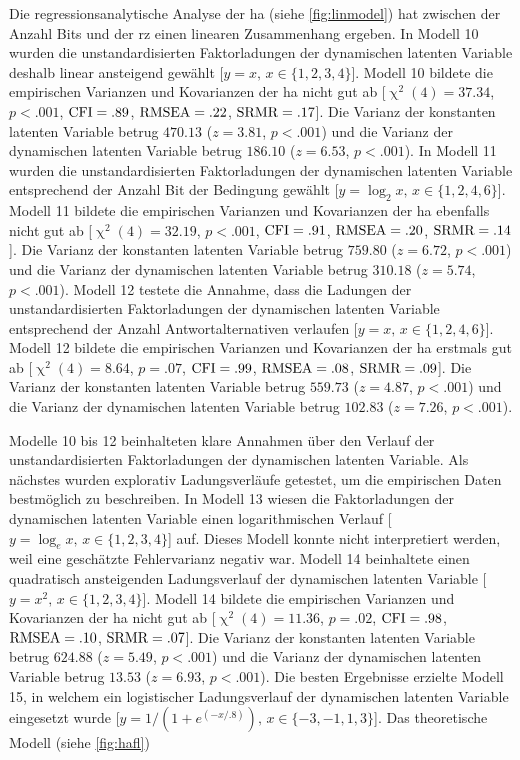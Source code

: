 \documentclass[11pt, twoside, a4paper]{book}		%
\begin{document}
Die regressionsanalytische Analyse der \gls{ha} (siehe \autoref{fig:linmodel}) hat zwischen der Anzahl Bits und der \gls{rz} einen linearen Zusammenhang ergeben. In Modell 10 wurden die unstandardisierten Faktorladungen der dynamischen latenten Variable deshalb linear ansteigend gewählt [$y=x,\,x\in\{1, 2, 3, 4\}$]. Modell 10 bildete die empirischen Varianzen und Kovarianzen der \gls{ha} nicht gut ab [$\upchi^2(4)=37.34$, $p<.001$, $\textnormal{CFI}=.89$, $\textnormal{RMSEA}=.22$, $\textnormal{SRMR}=.17$]. Die Varianz der konstanten latenten Variable betrug $470.13$ ($z=3.81$, $p<.001$) und die Varianz der dynamischen latenten Variable betrug $186.10$ ($z=6.53$, $p<.001$).
In Modell 11 wurden die unstandardisierten Faktorladungen der dynamischen latenten Variable entsprechend der Anzahl Bit der Bedingung gewählt [$y=\log_{2}x,\,x\in\{1, 2, 4, 6\}$]. Modell 11 bildete die empirischen Varianzen und Kovarianzen der \gls{ha} ebenfalls nicht gut ab [$\upchi^2(4)=32.19$, $p<.001$, $\textnormal{CFI}=.91$, $\textnormal{RMSEA}=.20$, $\textnormal{SRMR}=.14$]. Die Varianz der konstanten latenten Variable betrug $759.80$ ($z=6.72$, $p<.001$) und die Varianz der dynamischen latenten Variable betrug $310.18$ ($z=5.74$, $p<.001$).
Modell 12 testete die Annahme, dass die Ladungen der unstandardisierten Faktorladungen der dynamischen latenten Variable entsprechend der Anzahl Antwortalternativen verlaufen [$y=x,\,x\in\{1, 2, 4, 6\}$]. Modell 12 bildete die empirischen Varianzen und Kovarianzen der \gls{ha} erstmals gut ab [$\upchi^2(4)=8.64$, $p=.07$, $\textnormal{CFI}=.99$, $\textnormal{RMSEA}=.08$, $\textnormal{SRMR}=.09$]. Die Varianz der konstanten latenten Variable betrug $559.73$ ($z=4.87$, $p<.001$) und die Varianz der dynamischen latenten Variable betrug $102.83$ ($z=7.26$, $p<.001$).

Modelle 10 bis 12 beinhalteten klare Annahmen über den Verlauf der unstandardisierten Faktorladungen der dynamischen latenten Variable. Als nächstes wurden explorativ Ladungsverläufe getestet, um die empirischen Daten bestmöglich zu beschreiben. 
In Modell 13 wiesen die Faktorladungen der dynamischen latenten Variable einen logarithmischen Verlauf [$y=\log_{e}x,\,x\in\{1, 2, 3, 4\}$] auf. Dieses Modell konnte nicht interpretiert werden, weil eine geschätzte Fehlervarianz negativ war.
Modell 14 beinhaltete einen quadratisch ansteigenden Ladungsverlauf der dynamischen latenten Variable [$y=x^2,\,x\in\{1, 2, 3, 4\}$]. Modell 14 bildete die empirischen Varianzen und Kovarianzen der \gls{ha} nicht gut ab [$\upchi^2(4)=11.36$, $p=.02$, $\textnormal{CFI}=.98$, $\textnormal{RMSEA}=.10$, $\textnormal{SRMR}=.07$]. Die Varianz der konstanten latenten Variable betrug $624.88$ ($z=5.49$, $p<.001$) und die Varianz der dynamischen latenten Variable betrug $13.53$ ($z=6.93$, $p<.001$).
Die besten Ergebnisse erzielte Modell 15, in welchem ein logistischer Ladungsverlauf der dynamischen latenten Variable eingesetzt wurde [$y={1}/({1 + e^{(-x/.8)}}),\,x\in\{-3,-1,1,3\}$]. Das theoretische Modell (siehe \autoref{fig:hafl}) 
\end{document}
